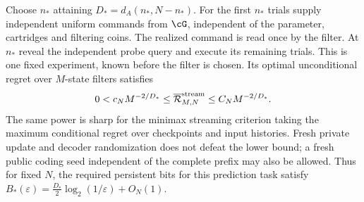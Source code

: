 \begin{theorem}\label{thm:stream-lower}
Choose $n_*$ attaining $D_*=d_A(n_*,N-n_*)$. For the first $n_*$ trials
supply independent uniform commands from $\cG$, independent of the
parameter, cartridges and filtering coins. The realized command is read
once by the filter. At $n_*$ reveal the independent probe query and execute
its remaining trials. This is one fixed experiment, known before the
filter is chosen. Its optimal unconditional regret over $M$-state filters
satisfies
\begin{equation}\label{eq:stream-match}
 0<c_NM^{-2/D_*}\le\overline{\mathcal R}_{M,N}^{\rm stream}
                  \le C_NM^{-2/D_*}.
\end{equation}
The same power is sharp for the minimax streaming criterion taking the
maximum conditional regret over checkpoints and input histories. Fresh
private update and decoder randomization does not defeat the lower bound;
a fresh public coding seed independent of the complete prefix may also be
allowed. Thus for fixed $N$, the required persistent bits for this prediction
task satisfy
$B_*(\varepsilon)=\tfrac{D_*}{2}\log_2(1/\varepsilon)+O_N(1)$.
\end{theorem}
